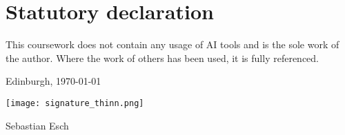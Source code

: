 \section*{Statutory declaration}
\vspace{2cm}

This coursework does not contain any usage of AI tools and is the sole work of the author.
Where the work of others has been used, it is fully referenced.

\vspace{2cm}

\begin{minipage}[b]{0.5\textwidth}
    Edinburgh, \today 
\end{minipage}

\begin{minipage}[b]{0.5\textwidth}
    \texttt{[image: signature\_thinn.png]}
\end{minipage}

{\footnotesize Sebastian Esch}\\
\vspace{2cm}